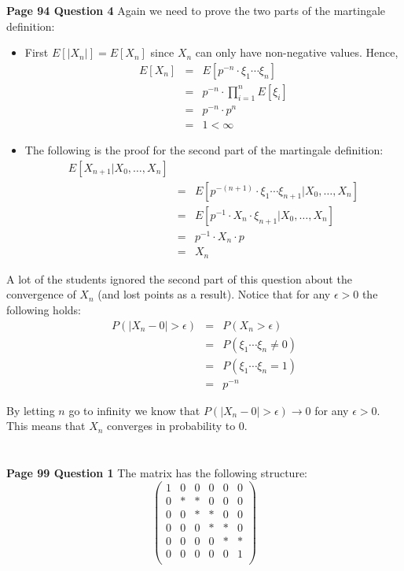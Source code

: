\documentclass[10pt,a4paper]{article}
\begin{document}
\begin{flushleft}
\begin{eqnarray*}
\\
\end{eqnarray*}

\textbf{Page 94 Question 4} Again we need to prove the two parts
of the martingale definition:
\begin{itemize}
    \item First $E[|X_n|]=E[X_n]$ since $X_n$ can only have
    non-negative values. Hence,
    \begin{eqnarray*}
    E[X_n]&=&E[p^{-n} \cdot \xi_1 \cdots \xi_n]\\
    &=& p^{-n} \cdot \prod_{i=1}^n E[\xi_i]\\
    &=& p^{-n} \cdot p^n \\
    &=& 1 < \infty
    \end{eqnarray*}
    \item The following is the proof for the second part of the
    martingale definition:
    \begin{eqnarray*}
    E[X_{n+1}|X_0,\ldots,X_n]\\
    &=&E[p^{-(n+1)} \cdot \xi_1 \cdots \xi_{n+1}|X_0,\ldots,X_n]\\
    &=&E[p^{-1} \cdot X_n \cdot \xi_{n+1}|X_0,\ldots,X_n]\\
    &=& p^{-1} \cdot X_n \cdot p \\
    &=& X_n
    \end{eqnarray*}
\end{itemize}

A lot of the students ignored the second part of this question
about the convergence of $X_n$ (and lost points as a result).
Notice that for any $\epsilon>0$ the following holds:
\begin{eqnarray*}
P(|X_n-0|>\epsilon)&=&P(X_n>\epsilon)\\
&=&P(\xi_1 \cdots \xi_{n}\neq 0 )\\
&=&P(\xi_1 \cdots \xi_{n}= 1 )\\
&=& p^{-n}
\end{eqnarray*}

By letting $n$ go to infinity we know that
$P(|X_n-0|>\epsilon)\rightarrow 0$ for any $\epsilon>0$. This
means that $X_n$ converges in probability to 0.



\begin{eqnarray*}
\\
\end{eqnarray*}

\textbf{Page 99 Question 1} The matrix has the following
structure:
\[ \left( \begin{array}{cccccc}
1 & 0 & 0 & 0 & 0 & 0  \\
0 & * & * & 0 & 0 & 0  \\
0 & 0 & * & * & 0 & 0  \\
0 & 0 & 0 & * & * & 0  \\
0 & 0 & 0 & 0 & * & *  \\
0 & 0 & 0 & 0 & 0 & 1  \\
\end{array} \right)\]


\end{flushleft}
\end{document}
